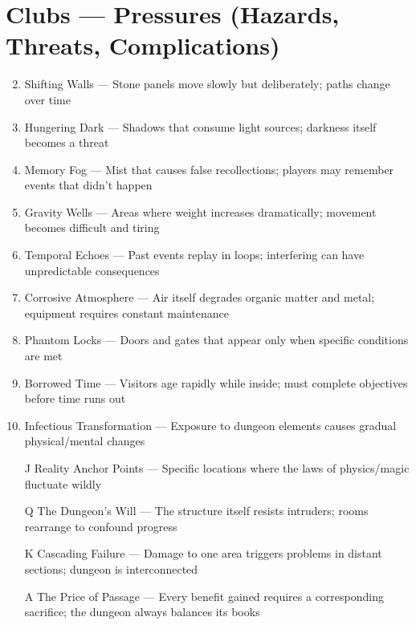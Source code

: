 \section*{Clubs --- Pressures (Hazards, Threats, Complications)}
\begin{enumerate}
\setcounter{enumi}{1}
\item Shifting Walls --- Stone panels move slowly but deliberately; paths change over time
\item Hungering Dark --- Shadows that consume light sources; darkness itself becomes a threat
\item Memory Fog --- Mist that causes false recollections; players may remember events that didn't happen
\item Gravity Wells --- Areas where weight increases dramatically; movement becomes difficult and tiring
\item Temporal Echoes --- Past events replay in loops; interfering can have unpredictable consequences
\item Corrosive Atmosphere --- Air itself degrades organic matter and metal; equipment requires constant maintenance
\item Phantom Locks --- Doors and gates that appear only when specific conditions are met
\item Borrowed Time --- Visitors age rapidly while inside; must complete objectives before time runs out
\item Infectious Transformation --- Exposure to dungeon elements causes gradual physical/mental changes
\item[J] Reality Anchor Points --- Specific locations where the laws of physics/magic fluctuate wildly
\item[Q] The Dungeon's Will --- The structure itself resists intruders; rooms rearrange to confound progress
\item[K] Cascading Failure --- Damage to one area triggers problems in distant sections; dungeon is interconnected
\item[A] The Price of Passage --- Every benefit gained requires a corresponding sacrifice; the dungeon always balances its books
\end{enumerate}


